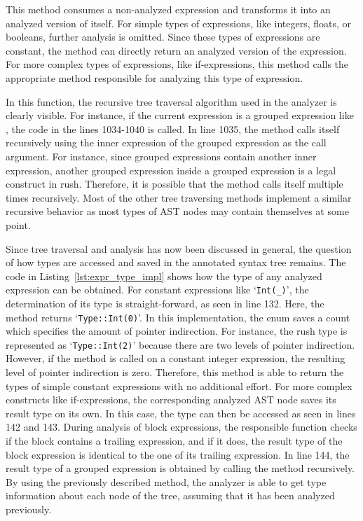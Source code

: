 This method consumes a non-analyzed expression and transforms it into an analyzed version of itself.
For simple types of expressions, like integers, floats, or booleans, further analysis is omitted.
Since these types of expressions are constant, the method can directly return an analyzed version of the expression.
For more complex types of expressions, like if-expressions, this method calls the appropriate method responsible for analyzing this type of expression.

In this function, the recursive tree traversal algorithm used in the analyzer is clearly visible.
For instance, if the current expression is a grouped expression like , the code in the lines 1034-1040 is called.
In line 1035, the  method calls itself recursively using the inner expression of the grouped expression as the call argument.
For instance, since grouped expressions contain another inner expression, another grouped expression inside a grouped expression is a legal construct in rush.
Therefore, it is possible that the  method calls itself multiple times recursively.
Most of the other tree traversing methods implement a similar recursive behavior as most types of AST nodes may contain themselves at some point.


Since tree traversal and analysis has now been discussed in general, the question of how types are accessed and saved in the annotated syntax tree remains.
The code in Listing~\ref{lst:expr_type_impl} shows how the type of any analyzed expression can be obtained.
For constant expressions like `\verb|Int(_)|', the determination of its type is straight-forward, as seen in line 132.
Here, the  method returns `\verb|Type::Int(0)|'.
In this implementation, the  enum saves a count which specifies the amount of pointer indirection.
For instance, the rush type  is represented as `\verb|Type::Int(2)|' because there are two levels of pointer indirection.
However, if the method is called on a constant integer expression, the resulting level of pointer indirection is zero.
Therefore, this method is able to return the types of simple constant expressions with no additional effort.
For more complex constructs like if-expressions, the corresponding analyzed AST node saves its result type on its own.
In this case, the type can then be accessed as seen in lines 142 and 143.
During analysis of block expressions, the responsible function checks if the block contains a trailing expression,
and if it does, the result type of the block expression is identical to the one of its trailing expression.
In line 144, the result type of a grouped expression is obtained by calling the  method recursively.
By using the previously described method, the analyzer is able to get type information about each node of the tree, assuming that it has been analyzed previously.

